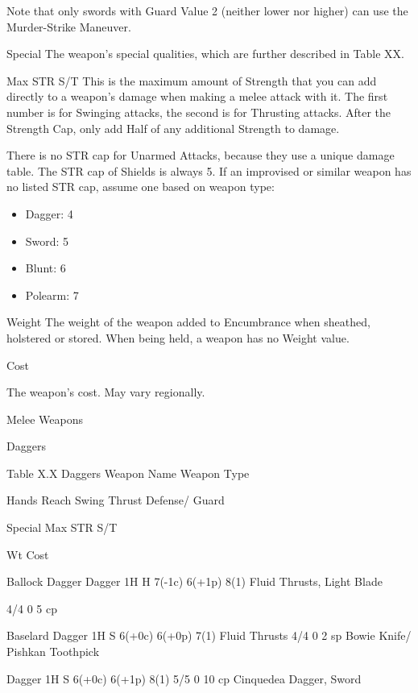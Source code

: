 \documentclass[oneside,11pt,english]{book}
\begin{document}
 

Note that only swords with Guard Value 2 (neither lower nor higher) can use the Murder-Strike 
Maneuver. 

 

Special 
The weapon’s special qualities, which are further described in Table XX. 

 

Max STR S/T 
This is the maximum amount of Strength that you can add directly to a weapon’s damage when making a 
melee attack with it. The first number is for Swinging attacks, the second is for Thrusting attacks. 
After the Strength Cap, only add Half of any additional Strength to damage. 

 

There is no STR cap for Unarmed Attacks, because they use a unique damage table. The STR cap of 
Shields is always 5. If an improvised or similar weapon has no listed STR cap, assume one based on 
weapon type: 
\begin{itemize}
\item Dagger: 4 
\item Sword: 5 
\item Blunt: 6 
\item Polearm: 7 
\end{itemize}
 

Weight 
The weight of the weapon added to Encumbrance when sheathed, holstered or stored. When being held, a 
weapon has no Weight value. 

 

Cost 


The weapon’s cost. May vary regionally. 

 

Melee Weapons 

 

Daggers 

 
Table X.X Daggers 
Weapon Name Weapon 
Type 

Hands Reach Swing Thrust Defense/ 
Guard 

Special Max 
STR 
S/T 

Wt Cost 

Ballock Dagger Dagger 1H H 7(-1c) 6(+1p) 8(1) Fluid Thrusts, Light 
Blade 

4/4 0 5 cp 

Baselard Dagger 1H S 6(+0c) 6(+0p) 7(1) Fluid Thrusts 4/4 0 2 sp 
Bowie Knife/ Pishkan 
Toothpick 

Dagger 1H S 6(+0c) 6(+1p) 8(1) 5/5 0 10 
cp 
Cinquedea Dagger, 
Sword 
\end{document}

